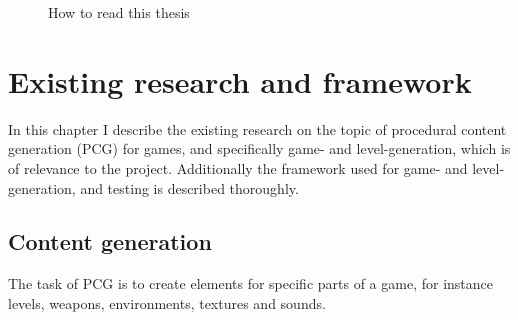 \documentclass[a4paper,titlepage,final]{report}
\begin{document}
\begin{figure}[!ht]
\caption{How to read this thesis}
\label{fig:vgdlgame}
\end{figure}


\chapter{Existing research and framework}
\label{ch_existingresearch}
In this chapter I describe the existing research on the topic of procedural content generation (PCG) for games, and specifically game- and level-generation, which is of relevance to the project.
Additionally the framework used for game- and level-generation, and testing is described thoroughly.



\section{Content generation}
\label{sec_contengen}
The task of PCG is to create elements for specific parts of a game, for instance levels, weapons, environments, textures and sounds. 
\end{document}
